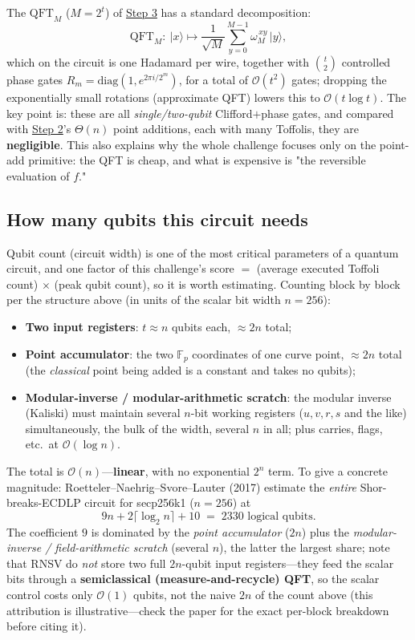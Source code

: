 \documentclass[11pt]{article}
\begin{document}
The $\mathrm{QFT}_M$ ($M=2^t$) of \hyperref[step:qft]{Step 3} has a standard decomposition:
\[
\mathrm{QFT}_M:\ \lvert x\rangle\longmapsto \frac{1}{\sqrt M}\sum_{y=0}^{M-1}\omega_M^{\,xy}\,\lvert y\rangle,
\]
which on the circuit is one Hadamard per wire, together with $\binom{t}{2}$ controlled phase gates $R_m=\mathrm{diag}(1,e^{2\pi i/2^m})$, for a total of
$\mathcal{O}(t^2)$ gates; dropping the exponentially small rotations (approximate QFT) lowers this to $\mathcal{O}(t\log t)$. The key point is: these are all \emph{single/two-qubit}
Clifford$+$phase gates, and compared with \hyperref[step:eval]{Step 2}'s $\Theta(n)$ point additions, each with many Toffolis, they are \textbf{negligible}. This also explains why the whole
challenge focuses only on the point-add primitive: the QFT is cheap, and what is expensive is "the reversible evaluation of $f$."

\subsection{How many qubits this circuit needs}
\label{ssec:qubits}

Qubit count (circuit width) is one of the most critical parameters of a quantum circuit, and one factor of this challenge's score $=$ (average executed Toffoli count) $\times$ (peak qubit count),
so it is worth estimating. Counting block by block per the structure above (in units of the scalar bit width $n=256$):
\begin{itemize}[leftmargin=1.4em]
\item \textbf{Two input registers}: $t\approx n$ qubits each, $\approx 2n$ total;
\item \textbf{Point accumulator}: the two $\mathbb{F}_p$ coordinates of one curve point, $\approx 2n$ total (the \emph{classical} point being added is a constant and takes no qubits);
\item \textbf{Modular-inverse / modular-arithmetic scratch}: the modular inverse (Kaliski) must maintain several $n$-bit working registers ($u,v,r,s$ and the like) simultaneously, the bulk of the width, several $n$
in all; plus carries, flags, etc.\ at $\mathcal{O}(\log n)$.
\end{itemize}
The total is $\mathcal{O}(n)$---\textbf{linear}, with no exponential $2^n$ term. To give a concrete magnitude: Roetteler--Naehrig--Svore--Lauter
(2017) estimate the \emph{entire} Shor-breaks-ECDLP circuit for secp256k1 ($n=256$) at
\[
9n+2\lceil\log_2 n\rceil+10 \;=\; 2330 \text{ logical qubits}.
\]
The coefficient $9$ is dominated by the \emph{point accumulator} ($2n$) plus the \emph{modular-inverse / field-arithmetic scratch} (several $n$), the latter the largest share; note that RNSV do \emph{not} store two full $2n$-qubit input registers---they feed the scalar bits through a \textbf{semiclassical (measure-and-recycle) QFT}, so the scalar control costs only $\mathcal{O}(1)$ qubits, not the naive $2n$ of the count above (this attribution is illustrative---check the paper for the exact per-block breakdown before citing it).
\end{document}
